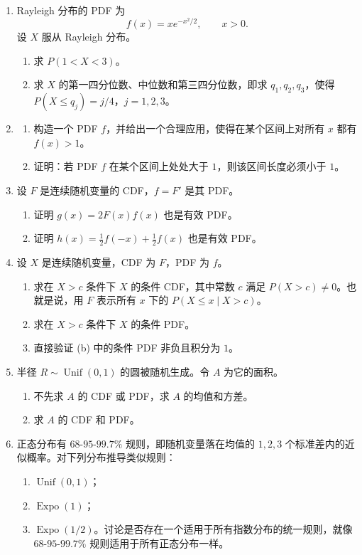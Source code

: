 \documentclass[UTF8, 12pt, fontset=fandol, oneside]{ctexart}
\begin{document}
\begin{enumerate}
  \item Rayleigh 分布的 PDF 为
  \[
    f(x)=xe^{-x^2/2},\qquad x>0.
  \]
  设 $X$ 服从 Rayleigh 分布。
  \begin{enumerate}
    \item 求 $P(1<X<3)$。
    \item 求 $X$ 的第一四分位数、中位数和第三四分位数，即求 $q_1,q_2,q_3$，使得 $P(X\le q_j)=j/4$，$j=1,2,3$。
  \end{enumerate}

  \item 
  \begin{enumerate}
    \item 构造一个 PDF $f$，并给出一个合理应用，使得在某个区间上对所有 $x$ 都有 $f(x)>1$。
    \item 证明：若 PDF $f$ 在某个区间上处处大于 $1$，则该区间长度必须小于 $1$。
  \end{enumerate}

  \item 设 $F$ 是连续随机变量的 CDF，$f=F'$ 是其 PDF。
  \begin{enumerate}
    \item 证明 $g(x)=2F(x)f(x)$ 也是有效 PDF。
    \item 证明 $h(x)=\frac12 f(-x)+\frac12 f(x)$ 也是有效 PDF。
  \end{enumerate}

  \item 设 $X$ 是连续随机变量，CDF 为 $F$，PDF 为 $f$。
  \begin{enumerate}
    \item 求在 $X>c$ 条件下 $X$ 的条件 CDF，其中常数 $c$ 满足 $P(X>c)\ne0$。也就是说，用 $F$ 表示所有 $x$ 下的 $P(X\le x\mid X>c)$。
    \item 求在 $X>c$ 条件下 $X$ 的条件 PDF。
    \item 直接验证 (b) 中的条件 PDF 非负且积分为 $1$。
  \end{enumerate}

  \item 半径 $R\sim\operatorname{Unif}(0,1)$ 的圆被随机生成。令 $A$ 为它的面积。
  \begin{enumerate}
    \item 不先求 $A$ 的 CDF 或 PDF，求 $A$ 的均值和方差。
    \item 求 $A$ 的 CDF 和 PDF。
  \end{enumerate}

  \item 正态分布有 $68$-$95$-$99.7\%$ 规则，即随机变量落在均值的 $1,2,3$ 个标准差内的近似概率。对下列分布推导类似规则：
  \begin{enumerate}
    \item $\operatorname{Unif}(0,1)$；
    \item $\operatorname{Expo}(1)$；
    \item $\operatorname{Expo}(1/2)$。讨论是否存在一个适用于所有指数分布的统一规则，就像 $68$-$95$-$99.7\%$ 规则适用于所有正态分布一样。
  \end{enumerate}


\end{enumerate}
\end{document}
